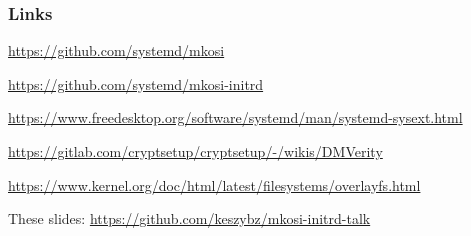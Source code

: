 \documentclass[]{beamer}
\begin{document}
\begin{frame}[fragile]
  \frametitle{Links}

  \url{https://github.com/systemd/mkosi}

  \url{https://github.com/systemd/mkosi-initrd}

  \url{https://www.freedesktop.org/software/systemd/man/systemd-sysext.html}

  {
    \small
    \url{https://gitlab.com/cryptsetup/cryptsetup/-/wikis/DMVerity}\\
    }

  \url{https://www.kernel.org/doc/html/latest/filesystems/overlayfs.html}

  These slides: \url{https://github.com/keszybz/mkosi-initrd-talk}

\end{frame}
\end{document}
